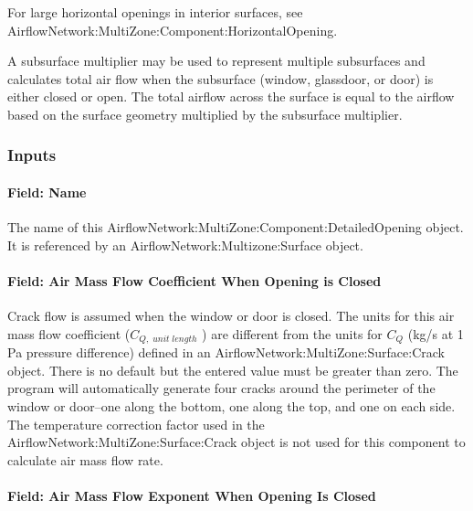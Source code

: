 For large horizontal openings in interior surfaces, see Air\-flow\-Net\-work:\-Multi\-Zone:\-Component:\-Horizontal\-Opening.

A subsurface multiplier may be used to represent multiple subsurfaces and calculates total air flow when the subsurface (window, glassdoor, or door) is either closed or open. The total airflow across the surface is equal to the airflow based on the surface geometry multiplied by the subsurface multiplier.

\subsubsection{Inputs}\label{inputs-4-003}

\paragraph{Field: Name}\label{field-name-4-003}

The name of this Air\-flow\-Net\-work:\-Multi\-Zone:\-Com\-ponent:\-Detailed\-Opening object. It is referenced by an Air\-flow\-Net\-work:\-Multi\-zone:\-Surface object.

\paragraph{Field: Air Mass Flow Coefficient When Opening is Closed}\label{field-air-mass-flow-coefficient-when-opening-is-closed}

Crack flow is assumed when the window or door is closed. The units for this air mass flow coefficient (\({C_{Q,\;unit\;length}}\) ) are different from the units for \({C_Q}\) (kg/s at 1 Pa pressure difference) defined in an Air\-flow\-Net\-work:\-Multi\-Zone:\-Sur\-face:\-Crack object. There is no default but the entered value must be greater than zero. The program will automatically generate four cracks around the perimeter of the window or door--one along the bottom, one along the top, and one on each side. The temperature correction factor used in the Air\-flow\-Net\-work:\-Multi\-Zone:\-Sur\-face:\-Crack object is not used for this component to calculate air mass flow rate.

\paragraph{Field: Air Mass Flow Exponent When Opening Is Closed}\label{field-air-mass-flow-exponent-when-opening-is-closed}

